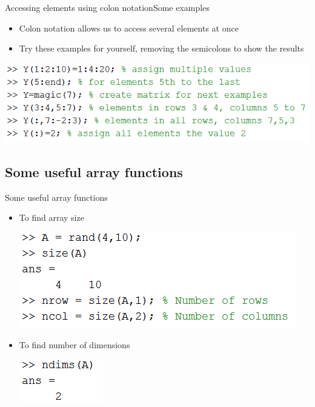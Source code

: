 \documentclass{beamer}
\begin{document}
\begin{frame}{Accessing elements using colon notation}{Some examples}
	\begin{itemize}
		\item Colon notation allows us to access several elements at once 
		\item Try these examples for yourself, removing the semicolons to show the results
	\end{itemize}
	
	\includegraphics[scale=0.7]{colon_notation_array_examples}
\end{frame}

\subsection{Some useful array functions}
\begin{frame}{Some useful array functions}
	\begin{itemize}
		\item To find array size
		
		\includegraphics[scale=0.7]{array_size}
		
		\item To find number of dimensions
		
		\includegraphics[scale=0.7]{array_ndims}
	\end{itemize}
\end{frame}
\end{document}
